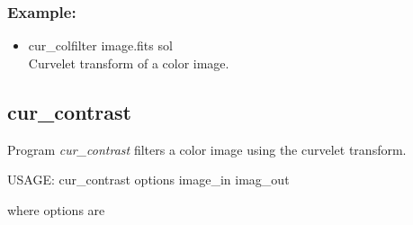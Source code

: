 \subsubsection*{Example:}
\begin{itemize}
\item cur\_colfilter image.fits sol\\
Curvelet transform of a color image.
\end{itemize}


\subsection{cur\_contrast}

Program {\em cur\_contrast} filters a color image using the curvelet transform.
\begin{center}
 USAGE:  cur\_contrast options image\_in imag\_out
\end{center}
where options are 

